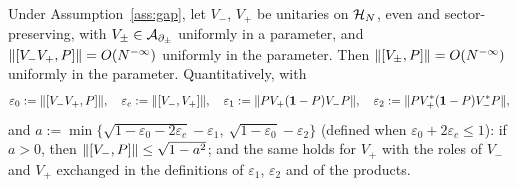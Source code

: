 \begin{lemma}\label{lem:bbdf42}
Under Assumption~\ref{ass:gap}, let $V_-$, $V_+$ be unitaries on $\mathcal{H}_N$, even and sector-preserving, with
$V_\pm\in\mathcal{A}_{\partial_\pm}$ uniformly in a parameter, and $\lVert[V_-V_+,P]\rVert=O(N^{-\infty})$ uniformly in the
parameter. Then $\lVert[V_\pm,P]\rVert=O(N^{-\infty})$ uniformly in the parameter. Quantitatively, with
\[
\varepsilon_0:=\lVert[V_-V_+,P]\rVert,\quad\varepsilon_c:=\lVert[V_-,V_+]\rVert,\quad \varepsilon_1:=\lVert PV_+(\mathbf{1}-P)V_-P\rVert,\quad
\varepsilon_2:=\lVert PV_+^*(\mathbf{1}-P)V_-^*P\rVert,
\]
and $a:=\min\bigl\{\sqrt{1-\varepsilon_0-2\varepsilon_c}-\varepsilon_1,\ \sqrt{1-\varepsilon_0}-\varepsilon_2\bigr\}$ (defined when
$\varepsilon_0+2\varepsilon_c\le1$): if $a>0$, then $\lVert[V_-,P]\rVert\le\sqrt{1-a^2}$; and the same holds for $V_+$ with the
roles of $V_-$ and $V_+$ exchanged in the definitions of $\varepsilon_1$, $\varepsilon_2$ and of the products.
\end{lemma}

